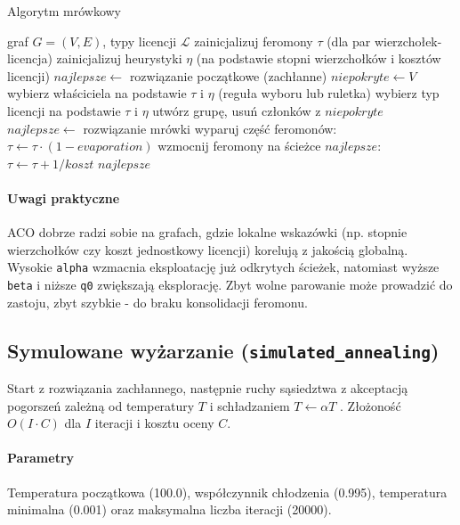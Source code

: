 \begin{algorithm}[H]
\caption{Algorytm mrówkowy}
\label{alg:aco}
\begin{algorithmic}[1]
\Require graf $G=(V,E)$, typy licencji $\mathcal{L}$
\State zainicjalizuj feromony $\tau$ (dla par wierzchołek-licencja)
\State zainicjalizuj heurystyki $\eta$ (na podstawie stopni wierzchołków i kosztów licencji)
\State $najlepsze \gets$ rozwiązanie początkowe (zachłanne)
    \State $niepokryte \gets V$
      \State wybierz właściciela na podstawie $\tau$ i $\eta$ (reguła wyboru lub ruletka)
      \State wybierz typ licencji na podstawie $\tau$ i $\eta$
      \State utwórz grupę, usuń członków z $niepokryte$
    \EndWhile
      \State $najlepsze \gets$ rozwiązanie mrówki
    \EndIf
  \EndFor
  \State wyparuj część feromonów: $\tau \gets \tau \cdot (1-evaporation)$
  \State wzmocnij feromony na ścieżce $najlepsze$: $\tau \gets \tau + 1/koszt$
\EndFor
\State \Return $najlepsze$
\end{algorithmic}
\end{algorithm}

\paragraph{Uwagi praktyczne}
ACO dobrze radzi sobie na grafach, gdzie lokalne wskazówki (np. stopnie wierzchołków czy koszt jednostkowy licencji) korelują z jakością globalną. Wysokie \texttt{alpha} wzmacnia eksploatację już odkrytych ścieżek, natomiast wyższe \texttt{beta} i niższe \texttt{q0} zwiększają eksplorację. Zbyt wolne parowanie może prowadzić do zastoju, zbyt szybkie - do braku konsolidacji feromonu.

\subsection{Symulowane wyżarzanie (\texttt{simulated\_annealing})}\label{subsec:sa}
Start z rozwiązania zachłannego, następnie ruchy sąsiedztwa z akceptacją pogorszeń zależną od temperatury \(T\) i schładzaniem \(T\leftarrow \alpha T\) \cite{kirkpatrick1983}. Złożoność \(O(I\cdot C)\) dla \(I\) iteracji i kosztu oceny \(C\).

\paragraph{Parametry}
Temperatura początkowa (100.0), współczynnik chłodzenia (0.995), temperatura minimalna (0.001) oraz maksymalna liczba iteracji (20000).

